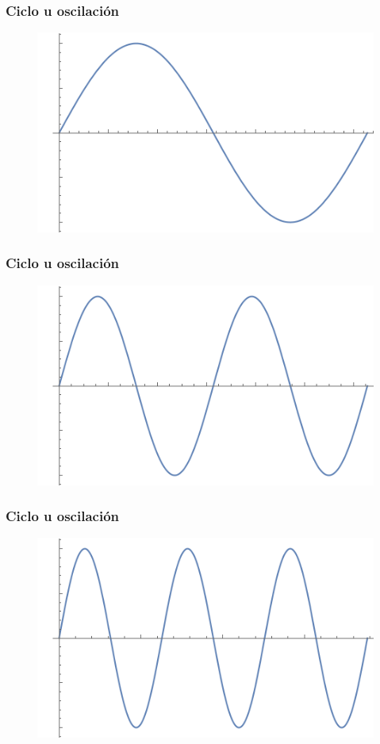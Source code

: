 \documentclass[14pt]{beamer}
\begin{document}
\begin{frame}
\frametitle{Ciclo u oscilación}
\begin{figure}
    \centering
    \includegraphics[scale=0.8]{Imagenes/Plot_Onda_06.png}
\end{figure}
\end{frame}
\begin{frame}
\frametitle{Ciclo u oscilación}
\begin{figure}
    \centering
    \includegraphics[scale=0.8]{Imagenes/Plot_Onda_06b.png}
\end{figure}
\end{frame}
\begin{frame}
\frametitle{Ciclo u oscilación}
\begin{figure}
    \centering
    \includegraphics[scale=0.8]{Imagenes/Plot_Onda_06c.png}
\end{figure}
\end{frame}
\end{document}
